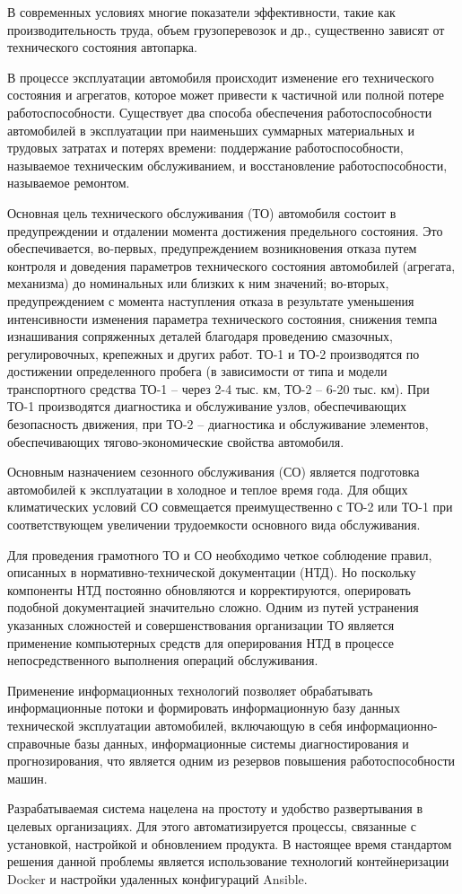 
В современных условиях многие показатели эффективности, такие как
производительность труда, объем грузоперевозок и др., существенно зависят от
технического состояния автопарка.

В процессе эксплуатации автомобиля происходит изменение его технического
состояния и агрегатов, которое может привести к частичной или полной потере
работоспособности. Существует два способа обеспечения работоспособности
автомобилей в эксплуатации при наименьших суммарных материальных и трудовых
затратах и потерях времени: поддержание работоспособности, называемое
техническим обслуживанием, и восстановление работоспособности, называемое
ремонтом.

Основная цель технического обслуживания (ТО) автомобиля состоит в предупреждении
и отдалении момента достижения предельного состояния. Это обеспечивается,
во-первых, предупреждением возникновения отказа путем контроля и доведения
параметров технического состояния автомобилей (агрегата, механизма) до
номинальных или близких к ним значений; во-вторых, предупреждением с момента
наступления отказа в результате уменьшения интенсивности изменения параметра
технического состояния, снижения темпа изнашивания сопряженных деталей благодаря
проведению смазочных, регулировочных, крепежных и других работ. ТО-1 и ТО-2
производятся по достижении определенного пробега (в зависимости от типа и модели
транспортного средства ТО-1 -- через 2-4 тыс. км, ТО-2 -- 6-20 тыс. км). При
ТО-1 производятся диагностика и обслуживание узлов, обеспечивающих безопасность
движения, при ТО-2 -- диагностика и обслуживание элементов, обеспечивающих
тягово-экономические свойства автомобиля.

Основным назначением сезонного обслуживания (СО) является подготовка автомобилей
к эксплуатации в холодное и теплое время года. Для общих климатических условий
СО совмещается преимущественно с ТО-2 или ТО-1 при соответствующем увеличении
трудоемкости основного вида обслуживания.

Для проведения грамотного ТО и СО необходимо четкое соблюдение правил, описанных
в нормативно-технической документации (НТД). Но поскольку компоненты НТД
постоянно обновляются и корректируются, оперировать подобной документацией
значительно сложно. Одним из путей устранения указанных сложностей и
совершенствования организации ТО является применение компьютерных средств для
оперирования НТД в процессе непосредственного выполнения операций обслуживания.

Применение информационных технологий позволяет обрабатывать информационные
потоки и формировать информационную базу данных технической эксплуатации
автомобилей, включающую в себя информационно-справочные базы данных,
информационные системы диагностирования и прогнозирования, что является одним из
резервов повышения работоспособности машин.

Разрабатываемая система нацелена на простоту и удобство развертывания в целевых
организациях. Для этого автоматизируется процессы, связанные с установкой,
настройкой и обновлением продукта. В настоящее время стандартом решения данной
проблемы является использование технологий контейнеризации Docker и настройки
удаленных конфигураций Ansible.
